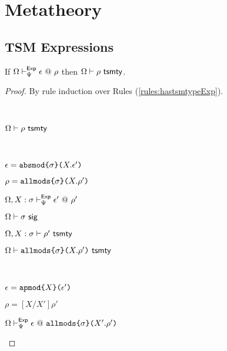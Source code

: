 \section{Metatheory}\label{appendix:metatheory-P}
\subsection{TSM Expressions}
\begin{lemma}
\label{lemma:peTSM-regularity}
If $\Omega \vdash_{\Psi}^{\mathsf{Exp}} \epsilon ~@~ \rho$ then $\Omega \vdash \rho~\mathsf{tsmty}$.
\end{lemma}
\begin{proof}
  By rule induction over Rules (\ref{rules:hastsmtypeExp}). 
  \begin{byCases}
    \item[\text{(\ref{rule:hastsmtypeExp-defref})}] ~
      \begin{pfsteps*}
        \item $\Omega \vdash \rho~\mathsf{tsmty}$ 
      \end{pfsteps*}
      \resetpfcounter
    \item[\text{(\ref{rule:hastsmtypeExp-absmod})}] ~
      \begin{pfsteps*}
        \item $\epsilon=\texttt{absmod}\texttt{\{}\sigma\texttt{\}(}X.\epsilon'\texttt{)}$ 
        \item $\rho=\texttt{allmods}\texttt{\{}\sigma\texttt{\}(}X.\rho'\texttt{)}$ 
        \item $\Omega, X : \sigma \vdash_{\Psi}^{\mathsf{Exp}} \epsilon' ~@~ \rho'$  
        \item $\Omega \vdash \sigma~\mathsf{sig}$  
        \item $\Omega, X : \sigma \vdash \rho'~\mathsf{tsmty}$  
        \item $\Omega \vdash \texttt{allmods}\texttt{\{}\sigma\texttt{\}(}X.\rho'\texttt{)}~\mathsf{tsmty}$ 
      \end{pfsteps*}
      \resetpfcounter
    \item[\text{(\ref{rule:hastsmtypeExp-apmod})}] ~
      \begin{pfsteps*}
        \item $\epsilon=\texttt{apmod}\texttt{\{}X\texttt{\}(}\epsilon'\texttt{)}$ 
        \item $\rho=[X/X']\rho'$ 
        \item $\Omega \vdash_{\Psi}^{\mathsf{Exp}} \epsilon ~@~ \texttt{allmods}\texttt{\{}\sigma\texttt{\}(}X'.\rho'\texttt{)}$  

\end{pfsteps*}
\end{byCases}
\end{proof}
